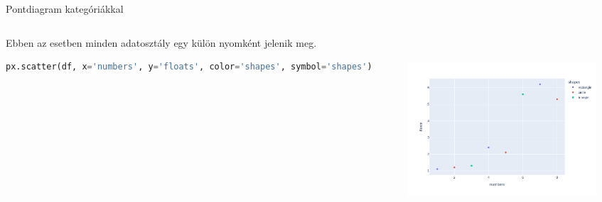 \documentclass[english, aspectratio=169]{beamer}
\begin{document}
\begin{frame}[fragile]{Pontdiagram kategóriákkal}
	\begin{columns}
		\begin{column}{.5\textwidth}
			Ebben az esetben minden adatosztály egy külön nyomként jelenik meg. 
			\vspace{0.3cm}
			\begin{lstlisting}[language=python]
px.scatter(df, x='numbers', y='floats', color='shapes', symbol='shapes')
			\end{lstlisting}
		\end{column}
		\begin{column}{.5\textwidth}
			\begin{center}
				\includegraphics[width=7cm, height=7cm, keepaspectratio]{images/plots_9.png}
			\end{center}
		\end{column}
	\end{columns}
\end{frame}
\end{document}
